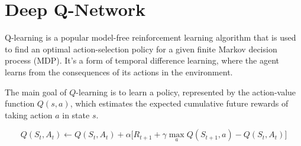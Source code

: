 \chapter{Deep Q-Network}
Q-learning is a popular model-free reinforcement learning algorithm that is used to find an optimal action-selection policy for a given finite Markov decision process (MDP). It's a form of temporal difference learning, where the agent learns from the consequences of its actions in the environment.

The main goal of $Q$-learning is to learn a policy, represented by the action-value function $Q(s,a)$, which estimates the expected cumulative future rewards of taking action $a$ in state $s$.


$$Q(S_t, A_t) \leftarrow Q(S_t, A_t)+ \alpha \Big[R_{t+1}+\gamma \max_a Q(S_{t+1}, a)-Q(S_t, A_t)\Big] $$

